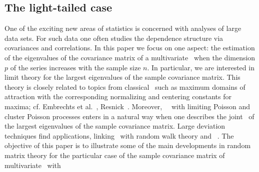 \subsection{The light-tailed case}
One of the exciting new areas of statistics is concerned with analyses of large data sets.
For such data one often studies the dependence structure via covariances and correlations.
In this paper we focus on one aspect: the estimation of the eigenvalues of the covariance matrix of a multivariate  \ts\
when the dimension $p$ of the series increases with the sample size $n$. In particular, we are interested in limit theory for the largest eigenvalues of the sample covariance matrix. This theory is closely related to topics from classical \evt\ such as
maximum domains of attraction with the corresponding normalizing and centering constants for maxima; cf. Embrechts et al.~\cite{embrechts:klueppelberg:mikosch:1997}, Resnick~\cite{resnick:2007,resnick:1987}.
Moreover, \pp\ \con\ with limiting Poisson and cluster Poisson processes enters in a natural way when one describes
the joint \con\ of the largest eigenvalues of the sample covariance matrix. Large deviation techniques find applications,
linking \evt\ with random walk theory and \pp\ \con . The objective of this paper is to illustrate some of the main
developments in random matrix theory for the particular case of the sample covariance matrix of multivariate \ts\ with
